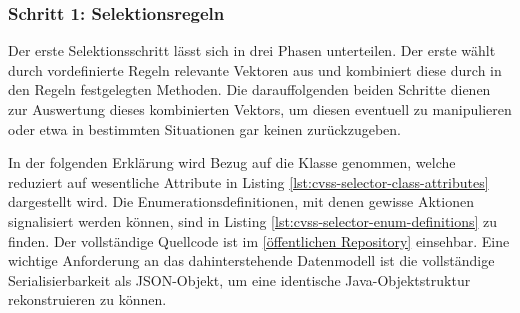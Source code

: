 \subsubsection{Schritt 1: Selektionsregeln} \label{subsubsec:projektbericht-loesungsweg-cvss-selection-rules-1}

Der erste Selektionsschritt lässt sich in drei Phasen unterteilen.
Der erste wählt durch vordefinierte Regeln relevante Vektoren aus und kombiniert diese durch in den Regeln festgelegten Methoden.
Die darauffolgenden beiden Schritte dienen zur Auswertung dieses kombinierten Vektors, um diesen eventuell zu manipulieren oder etwa in bestimmten Situationen gar keinen zurückzugeben.

In der folgenden Erklärung wird Bezug auf die Klasse  genommen, welche reduziert auf wesentliche Attribute in Listing \ref{lst:cvss-selector-class-attributes} dargestellt wird.
Die Enumerationsdefinitionen, mit denen gewisse Aktionen signalisiert werden können, sind in Listing \ref{lst:cvss-selector-enum-definitions} zu finden.
Der vollständige Quellcode ist im \href{https://github.com/org-metaeffekt/metaeffekt-core/blob/24a26dd37ab6f9087e2fdc1b338857b404fa835e/libraries/ae-security/src/main/java/org/metaeffekt/core/security/cvss/processor/CvssSelector.java#L337}{[öffentlichen Repository]} einsehbar.
Eine wichtige Anforderung an das dahinterstehende Datenmodell ist die vollständige Serialisierbarkeit als JSON-Objekt, um eine identische Java-Objektstruktur rekonstruieren zu können.

